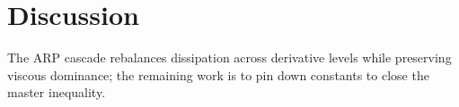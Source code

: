 \section{Discussion}
The ARP cascade rebalances dissipation across derivative levels while preserving viscous dominance; the remaining work is to pin down constants to close the master inequality.
